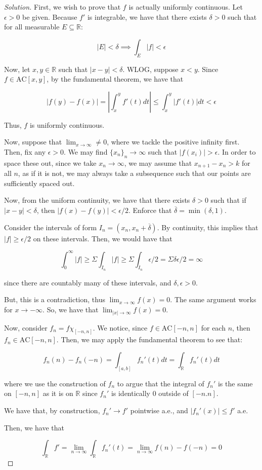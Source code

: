 \documentclass[10pt]{article}
\newcommand{\ac}{{\text{AC}}}
\begin{document}
\begin{proof}[Solution]

First, we wish to prove that $f$ is actually uniformly continuous. Let $\epsilon > 0$ be given. Because $f'$ is integrable, we have that there exists $\delta > 0$ such that for all measurable $E \subseteq \mathbb{R}$:

$$ |E| < \delta \implies \int_E |f| < \epsilon $$

Now, let $x,y \in \mathbb{R}$ such that $|x - y| < \delta$. WLOG, suppose $x < y$. Since $f \in \ac[x,y]$, by the fundamental theorem, we have that 

$$|f(y) - f(x)| = \left| \int_x^y f'(t) dt \right| \leq \int_x^y |f'(t)| dt < \epsilon $$

Thus, $f$ is uniformly continuous.

Now, suppose that $\lim_{x \to \infty} \not = 0$, where we tackle the positive infinity first. Then, fix any $\epsilon > 0$. We may find $\{ x_n \}_n \to \infty$ such that $|f(x_i)| > \epsilon$. In order to space these out, since we take $x_n \to \infty$, we may assume that $x_{n+1} - x_n > k$ for all $n$, as if it is not, we may always take a subsequence such that our points are sufficiently spaced out.

Now, from the uniform continuity, we have that there exists $\delta > 0$ such that if $| x - y | < \delta$, then $|f(x) - f(y)| < \epsilon/2$. Enforce that $\overline{\delta} = \min(\delta,1)$.

Consider the intervals of form $I_n = (x_n, x_n + \overline{\delta})$. By continuity, this implies that $|f| \geq \epsilon/2$ on these intervals. Then, we would have that 

$$\int_0^\infty |f| \geq \Sigma \int_{I_n} |f| \geq \Sigma \int_{I_n} \epsilon/2 = \Sigma \delta \epsilon/2 = \infty $$

since there are countably many of these intervals, and $\delta, \epsilon > 0$. 

But, this is a contradiction, thus $\lim_{x \to \infty} f(x) = 0$. The same argument works for $x \to -\infty$. So, we have that $\lim_{|x| \to \infty} f(x) = 0$.
 
Now, consider $f_n = f \chi_{[-n,n]}$. We notice, since $f \in \ac[-n,n]$ for each $n$, then $f_n \in \ac[-n,n]$. Then, we may apply the fundamental theorem to see that:

$$ f_n(n) - f_n(-n) = \int_{[a,b]} f_n'(t) dt = \int_{\mathbb{R}} f_n'(t)dt$$

where we use the construction of $f_n$ to argue that the integral of $f_n'$ is the same on $[-n,n]$ as it is on $\mathbb{R}$ since $f_n'$ is identically 0 outside of $[-n.n]$.

We have that, by construction, $f_n' \to f'$ pointwise a.e., and $|f_n'(x)| \leq f'$ a.e. 

Then, we have that

$$\int_{\mathbb{R}}f' = \lim_{n \to \infty} \int_{\mathbb{R}} f_n'(t) = \lim_{n \to \infty} f(n) - f(-n) = 0 $$

\end{proof}
\end{document}
